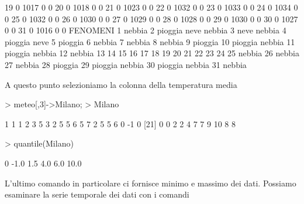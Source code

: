 \documentclass[onecolumn,12pt]{book}
\begin{document}
\begin{Schunk}
\begin{Soutput}
19            0            1017                 0          0
20            0            1018                 0          0
21            0            1023                 0          0
22            0            1032                 0          0
23            0            1033                 0          0
24            0            1034                 0          0
25            0            1032                 0          0
26            0            1030                 0          0
27            0            1029                 0          0
28            0            1028                 0          0
29            0            1030                 0          0
30            0            1027                 0          0
31            0            1016                 0          0
               FENOMENI
1               nebbia 
2  pioggia neve nebbia 
3          neve nebbia 
4         pioggia neve 
5              pioggia 
6               nebbia 
7               nebbia 
8               nebbia 
9              pioggia 
10      pioggia nebbia 
11      pioggia nebbia 
12              nebbia 
13                     
14                     
15                     
16                     
17                     
18                     
19                     
20                     
21                     
22                     
23                     
24                     
25              nebbia 
26              nebbia 
27              nebbia 
28             pioggia 
29      pioggia nebbia 
30      pioggia nebbia 
31              nebbia 
\end{Soutput}
\end{Schunk}
A questo punto selezioniamo la colonna della temperatura media 
\begin{Schunk}
\begin{Sinput}
> meteo[,3]->Milano;
> Milano
\end{Sinput}
\begin{Soutput}
 [1]  1  1  1  2  3  5  3  2  5  5  6  5  7  2  5  5  6  0 -1  0
[21]  0  0  2  2  4  7  7  9 10  8  8
\end{Soutput}
\begin{Sinput}
> quantile(Milano)
\end{Sinput}
\begin{Soutput}
  0%
-1.0  1.5  4.0  6.0 10.0 
\end{Soutput}
\end{Schunk}
L'ultimo comando in particolare ci fornisce minimo e massimo dei dati.
Possiamo esaminare la serie temporale dei dati con i comandi
\end{document}
